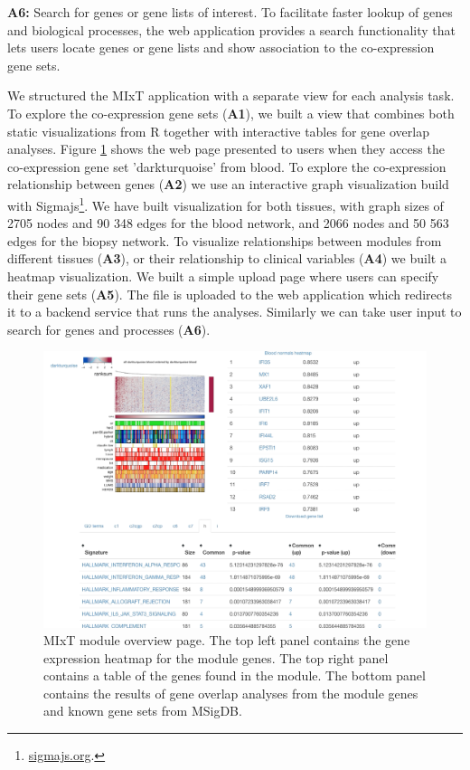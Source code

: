 \textbf{A6:} Search for genes or gene lists of interest. To facilitate faster
lookup of genes and biological processes, the web application provides a search
functionality that lets users locate genes or gene lists and show association to
the co-expression gene sets. 

We structured the MIxT application with a separate view for each analysis task.
To explore the co-expression gene sets (\textbf{A1}), we built a view that
combines both static visualizations from R together with interactive tables for
gene overlap analyses. Figure \ref{fig_first_case} shows the web page presented
to users when they access the co-expression gene set 'darkturquoise' from blood.
To explore the co-expression relationship between genes (\textbf{A2}) we use an
interactive graph visualization build with Sigmajs\footnote{\url{sigmajs.org}.}.
We have built visualization for both tissues, with graph sizes of 2705 nodes and
90 348 edges for the blood network, and 2066 nodes and 50 563 edges for the
biopsy network. 
To visualize relationships between modules from different tissues (\textbf{A3}),
or their relationship to clinical variables (\textbf{A4}) we built a heatmap
visualization.
We built a simple upload page where users can specify their gene sets
(\textbf{A5}). The file is uploaded to the web application which redirects it to
a backend service that runs the analyses. Similarly we can take user input to
search for genes and processes (\textbf{A6}).

\begin{figure}[h!]
\centering
\includegraphics[width=\columnwidth]{figures/module.png}
\caption{MIxT module overview page.
The top left panel
contains the gene expression heatmap for the module genes. The top right panel
contains a table of the genes found in the module. The bottom panel contains the
results of gene overlap analyses from the module genes and known gene sets from
MSigDB.}
\label{fig_first_case}
\end{figure} 

